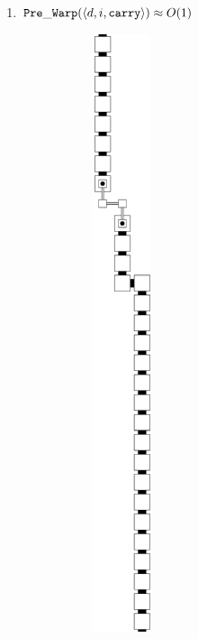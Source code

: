         \begin{enumerate}[label={--}]

            \item ${\tt Pre\_Warp}   (\langle d, i, {\tt carry}\rangle)\approx O(1)$
                \begin{figure}[H]
                    \centering
                    \begin{subfigure}[t]{0.2\textwidth}
                        \centering
                        \includegraphics[width=0.2\textwidth]{warping/pre_warp_general}

\end{subfigure}
\end{figure}
\end{enumerate}
